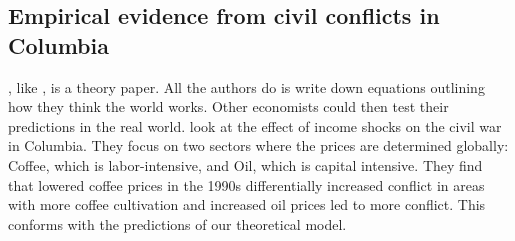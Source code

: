 \subsection*{Empirical evidence from civil conflicts in Columbia}
\citet{dalbodalbo}, like \citet{war}, is a theory paper. All the authors do is write down equations outlining how they think the world works. Other economists could then test their predictions in the real world. \citet{dube2013commodity} look at the effect of income shocks on the civil war in Columbia. They focus on two sectors where the prices are determined globally: Coffee, which is labor-intensive, and Oil, which is capital intensive. They find that lowered coffee prices in the 1990s differentially increased conflict in areas with more coffee cultivation and increased oil prices led to more conflict. This conforms with the predictions of our theoretical model. 




